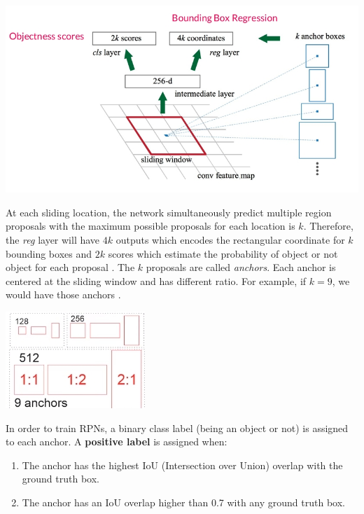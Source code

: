\documentclass{article}
\begin{document}
\begin{center}
	\includegraphics[scale=0.5]{faster_rcnn_rpn}
\end{center}

At each sliding location, the network simultaneously predict multiple region proposals with the maximum possible proposals for each location is $k$. Therefore, the \textit{reg} layer will have $4k$ outputs which encodes the rectangular coordinate for $k$ bounding boxes and $2k$ scores which estimate the probability of object or not object for each proposal \cite{arxiv/faster-rcnn}. The $k$ proposals are called \textit{anchors}. Each anchor is centered at the sliding window and has different ratio. For example, if $k = 9$, we would have those anchors \cite{videos/faster-rcnn}.

\begin{center}
	\includegraphics[scale=1.0]{faster_rcnn_anchors}
\end{center}

In order to train RPNs, a binary class label (being an object or not) is assigned to each anchor. A \textbf{positive label} is assigned when:
\begin{enumerate}
	\item	The anchor has the highest IoU (Intersection over Union) overlap with the ground truth box.
	\item	The anchor has an IoU overlap higher than 0.7 with any ground truth box.
\end{enumerate}
\end{document}

